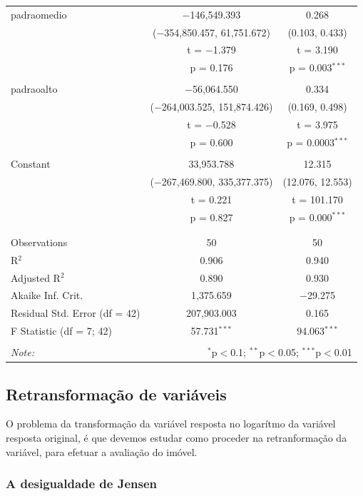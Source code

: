 \documentclass[a4paper]{article}
\begin{document}
\begin{table}[!htbp]
\begin{tabular}{@{\extracolsep{5pt}}lcc}
 padraomedio & $-$146,549.393 & 0.268 \\ 
  & ($-$354,850.457, 61,751.672) & (0.103, 0.433) \\ 
  & t = $-$1.379 & t = 3.190 \\ 
  & p = 0.176 & p = 0.003$^{***}$ \\ 
  & & \\ 
 padraoalto & $-$56,064.550 & 0.334 \\ 
  & ($-$264,003.525, 151,874.426) & (0.169, 0.498) \\ 
  & t = $-$0.528 & t = 3.975 \\ 
  & p = 0.600 & p = 0.0003$^{***}$ \\ 
  & & \\ 
 Constant & 33,953.788 & 12.315 \\ 
  & ($-$267,469.800, 335,377.375) & (12.076, 12.553) \\ 
  & t = 0.221 & t = 101.170 \\ 
  & p = 0.827 & p = 0.000$^{***}$ \\ 
  & & \\ 
\hline \\[-1.8ex] 
Observations & 50 & 50 \\ 
R$^{2}$ & 0.906 & 0.940 \\ 
Adjusted R$^{2}$ & 0.890 & 0.930 \\ 
Akaike Inf. Crit. & 1,375.659 & $-$29.275 \\ 
Residual Std. Error (df = 42) & 207,903.003 & 0.165 \\ 
F Statistic (df = 7; 42) & 57.731$^{***}$ & 94.063$^{***}$ \\ 
\hline 
\hline \\[-1.8ex] 
\textit{Note:}  & \multicolumn{2}{r}{$^{*}$p$<$0.1; $^{**}$p$<$0.05; $^{***}$p$<$0.01} \\ 
\end{tabular} 
\end{table}

\subsection{Retransformação de
variáveis}\label{retransformacao-de-variaveis}

O problema da transformação da variável resposta no logarítmo da
variável resposta original, é que devemos estudar como proceder na
retranformação da variável, para efetuar a avaliação do imóvel.

\subsubsection{A desigualdade de Jensen}\label{a-desigualdade-de-jensen}
\end{document}
